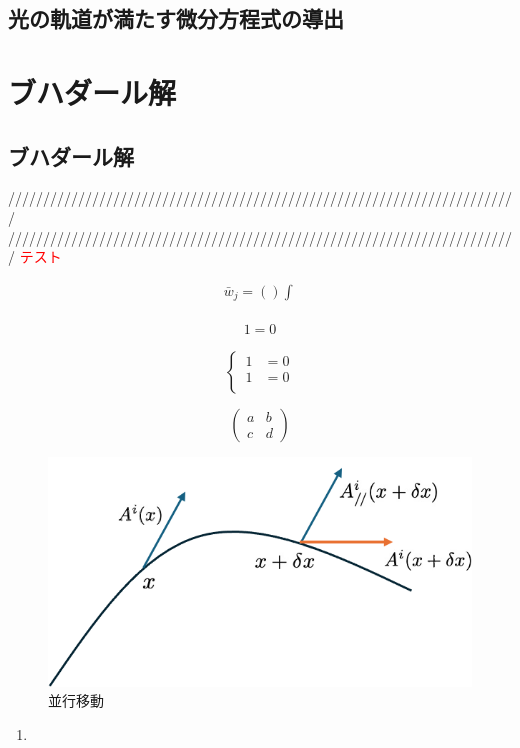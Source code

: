 \documentclass[dvipdfmx]{report} %
\begin{document}
\section{光の軌道が満たす微分方程式の導出}

\chapter{ブハダール解}

\section{ブハダール解}



/////////////////////////////////////////////////////////////////////////\\
/////////////////////////////////////////////////////////////////////////
\textcolor{red}{テスト}

\begin{equation*}
\begin{split}
	\bar{w}_j = \left( \right) \int^{}_{}
\end{split}
\end{equation*}

\begin{tcolorbox}[title=メモ用]
\begin{eqnarray*}
	1 = 0
\end{eqnarray*}
\end{tcolorbox}

\begin{equation}
\left\{ \,
\begin{aligned}
	1 &= 0\\
	1 &= 0\\
\end{aligned}
\right.
\end{equation}

\[
\left(
\begin{matrix}
a & b \\
c & d
\end{matrix}
\right)
\]


\begin{figure}[H]
    \centering
    \includegraphics[width=0.5\columnwidth]{./images/0106/01.png}
    \caption{並行移動}
    \label{}
\end{figure}

\begin{enumerate}[(1)\,]
\item{}
\end{enumerate}
\end{document}
